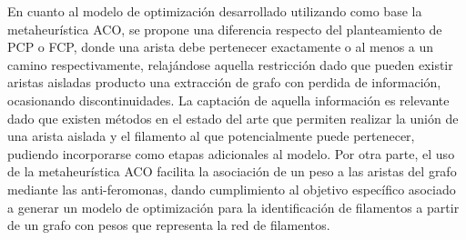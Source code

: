 En cuanto al modelo de optimizaci\'on desarrollado utilizando como base la metaheur\'istica ACO, se propone una diferencia respecto del planteamiento de PCP o FCP, donde una arista debe pertenecer exactamente o al menos a un camino respectivamente, relaj\'andose aquella restricci\'on dado que pueden existir aristas aisladas producto una extracci\'on de grafo con perdida de informaci\'on, ocasionando discontinuidades. La captaci\'on de aquella informaci\'on es relevante dado que existen m\'etodos en el estado del arte que permiten realizar la uni\'on de una arista aislada y el filamento al que potencialmente puede pertenecer, pudiendo incorporarse como etapas adicionales al modelo.
Por otra parte, el uso de la metaheur\'istica ACO facilita la asociaci\'on de un peso a las aristas del grafo mediante las anti-feromonas, dando cumplimiento al objetivo espec\'ifico asociado a generar un modelo de optimizaci\'on para la identificaci\'on de filamentos a partir de un grafo con pesos que representa la red de filamentos.

